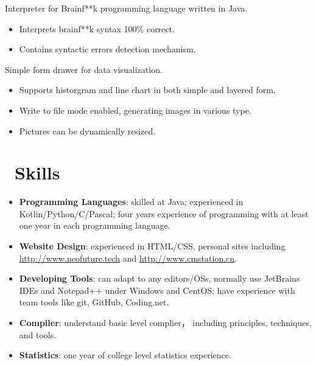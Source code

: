\documentclass{resume}
\begin{document}

Interpreter for Brainf**k programming language written in Java.
\begin{itemize}
  \item Interprets brainf**k syntax 100\% correct.
  \item Contains syntactic errors detection mechanism.
\end{itemize}

Simple form drawer for data visualization.
\begin{itemize}
  \item Supports historgram and line chart in both simple and layered form.
  \item Write to file mode enabled, generating images in various type.
  \item Pictures can be dynamically resized.
\end{itemize}

\section{\faCogs\ Skills}
\begin{itemize}[parsep=0.5ex]
  \item \textbf{Programming Languages}:
    skilled at Java; experienced in Kotlin/Python/C/Pascal; four years experience of programming with at least one year in each programming language.
  \item \textbf{Website Design}:
    experienced in HTML/CSS, personal sites including {\url{http://www.neofuture.tech}} and {\url{http://www.cmstation.cn}}.
  \item \textbf{Developing Tools}:
    can adapt to any editors/OSs, normally use JetBrains IDEs and Notepad++ under Windows and CentOS; have experience with team tools like git, GitHub, Coding.net.
  \item \textbf{Compiler}:
    understand basic level complier， including principles, techniques, and tools. 
  \item \textbf{Statistics}:
    one year of college level statistics experience.
\end{itemize}
\end{document}
